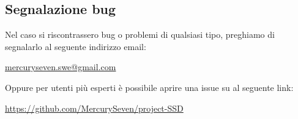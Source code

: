 \subsection{Segnalazione bug}

Nel caso si riscontrassero bug o problemi di qualsiasi tipo, preghiamo di segnalarlo al seguente indirizzo email:\newline{}
\centerline{\url{mercuryseven.swe@gmail.com}}
Oppure per utenti più esperti è possibile aprire una issue su  al seguente link:\newline{}
\centerline{\url{https://github.com/MercurySeven/project-SSD}}
